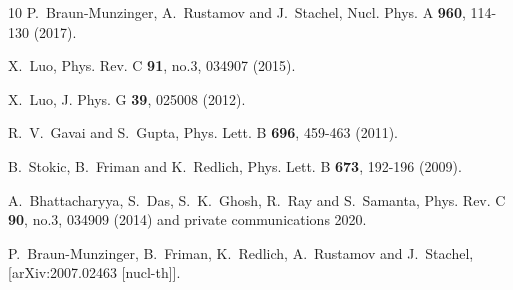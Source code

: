 \documentclass[10pt,aps,prc,twocolumn,floatfix]{revtex4-1}
\begin{document}
\begin{thebibliography}{10}
P.~Braun-Munzinger, A.~Rustamov and J.~Stachel,
Nucl. Phys. A \textbf{960}, 114-130 (2017).

X.~Luo,
Phys. Rev. C \textbf{91}, no.3, 034907 (2015).

X.~Luo,
J. Phys. G \textbf{39}, 025008 (2012).


R.~V.~Gavai and S.~Gupta, 
Phys. Lett. B \textbf{696}, 459-463 (2011).


B.~Stokic, B.~Friman and K.~Redlich,
Phys. Lett. B \textbf{673}, 192-196 (2009).

A.~Bhattacharyya, S.~Das, S.~K.~Ghosh, R.~Ray and S.~Samanta,
Phys. Rev. C \textbf{90}, no.3, 034909 (2014) and private
communications 2020.

P.~Braun-Munzinger, B.~Friman, K.~Redlich, A.~Rustamov and J.~Stachel, 
[arXiv:2007.02463 [nucl-th]]. 


\end{thebibliography}
\end{document}
